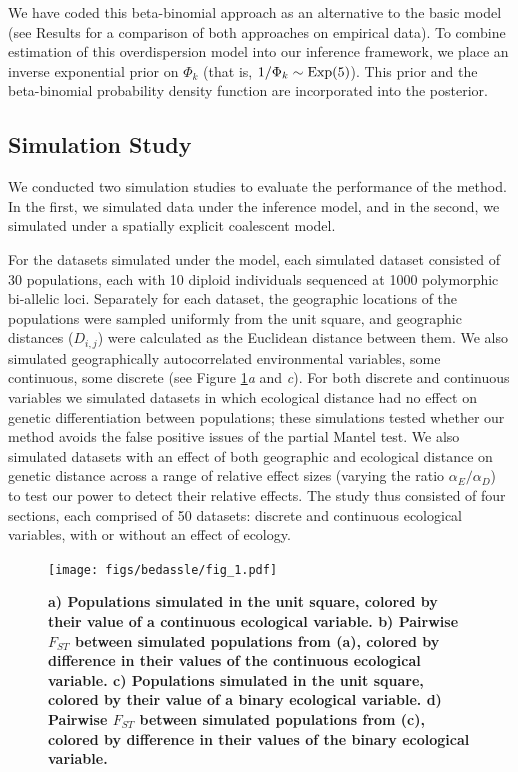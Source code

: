 We have coded this beta-binomial approach as an alternative to the basic model (see Results for a comparison of both approaches on empirical data).  To combine estimation of this overdispersion model into our inference framework, we place an inverse exponential prior on $\Phi_k$ (that is, $1/\Phi_k \sim \mathop{\mbox{Exp}}(5)$). This prior and the beta-binomial probability density function are incorporated into the posterior.  

\subsection*{Simulation Study}

We conducted two simulation studies to evaluate the performance of the method.  In the first, we simulated data under the inference model, and in the second, we simulated under a spatially explicit coalescent model.

For the datasets simulated under the model, 
each simulated dataset consisted of 30 populations, each with 10 diploid individuals sequenced at 1000 polymorphic bi-allelic loci.  Separately for each dataset, the geographic locations of the populations were sampled uniformly from the unit square, and geographic distances ($D_{i,j}$) were calculated as the Euclidean distance between them.  We also simulated geographically autocorrelated environmental variables, some continuous, some discrete (see Figure \ref{sfig:sim_info}\textit{a} and \textit{c}).  For both discrete and continuous variables we simulated datasets in which ecological distance had no effect on genetic differentiation between populations; these simulations tested whether our method avoids the false positive issues of the partial Mantel test.  We also simulated datasets with an effect of both geographic and ecological distance on genetic distance across a range of relative effect sizes (varying the ratio $\alpha_{E}/\alpha_{D}$) to test our power to detect their relative effects. The study thus consisted of four sections, each comprised of 50 datasets: discrete and continuous ecological variables, with or without an effect of ecology.

\begin{figure}[ht!]
\begin{center}
  \texttt{[image: figs/bedassle/fig\_1.pdf]}
 \caption{
	\bf{a)}
 		\textmd{Populations simulated in the unit square, colored by their value of a continuous ecological variable.}
	\bf{b)}
 		\textmd{Pairwise $F_{ST}$ between simulated populations from (a), colored by difference in their values of the continuous ecological variable.}
	\bf{c)}
  		\textmd{Populations simulated in the unit square, colored by their value of a binary ecological variable.}
	\bf{d)}
 		\textmd{Pairwise $F_{ST}$ between simulated populations from (c), colored by difference in their values of the binary ecological variable.}
 \label{sfig:sim_info}
  }
\end{center}
\end{figure}


